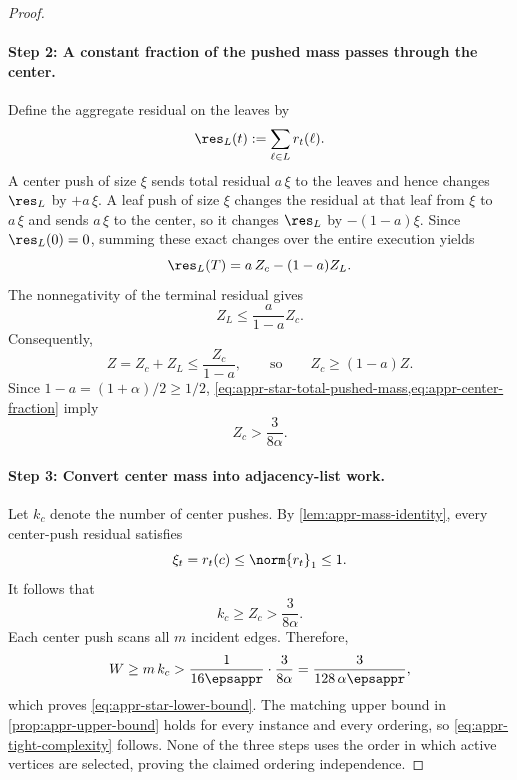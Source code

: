 \begin{proof}
\paragraph{Step 2: A constant fraction of the pushed mass passes through the
center.}
Define the aggregate residual on the leaves by
\begin{equation}
    \res_L(t):=\sum_{\ell\in L}r_t(\ell).
    \label{eq:appr-leaf-residual}
\end{equation}
A center push of size \(\xi\) sends total residual \(a\,\xi\) to the leaves and
hence changes \(\res_L\) by \(+a\,\xi\). A leaf push of size \(\xi\) changes the
residual at that leaf from \(\xi\) to \(a\,\xi\) and sends \(a\,\xi\) to the center,
so it changes \(\res_L\) by \(-(1-a)\xi\). Since \(\res_L(0)=0\), summing these
exact changes over the entire execution yields
\begin{equation}
    \res_L(T)=a\,Z_c-(1-a)Z_L.
    \label{eq:appr-leaf-flow-identity}
\end{equation}
The nonnegativity of the terminal residual gives
\begin{equation}
    Z_L\leq\frac{a}{1-a}Z_c.
    \label{eq:appr-leaf-center-comparison}
\end{equation}
Consequently,
\begin{equation}
    Z=Z_c+Z_L
    \leq\frac{Z_c}{1-a},
    \qquad\text{so}\qquad
    Z_c\geq(1-a)Z.
    \label{eq:appr-center-fraction}
\end{equation}
Since \(1-a=(1+\alpha)/2\geq1/2\),
\cref{eq:appr-star-total-pushed-mass,eq:appr-center-fraction} imply
\begin{equation}
    Z_c>\frac{3}{8\alpha}.
    \label{eq:appr-center-pushed-mass}
\end{equation}

\paragraph{Step 3: Convert center mass into adjacency-list work.}
Let \(k_c\) denote the number of center pushes. By
\cref{lem:appr-mass-identity}, every center-push residual satisfies
\begin{equation}
    \xi_t=r_t(c)\leq\norm{r_t}_1\leq1.
    \label{eq:appr-center-push-at-most-one}
\end{equation}
It follows that
\begin{equation}
    k_c\geq Z_c>\frac{3}{8\alpha}.
    \label{eq:appr-number-center-pushes}
\end{equation}
Each center push scans all \(m\) incident edges. Therefore,
\begin{equation}
    W
    \geq m\,k_c
    >\frac{1}{16\epsappr}\cdot\frac{3}{8\alpha}
    =\frac{3}{128\,\alpha\epsappr},
    \label{eq:appr-final-star-calculation}
\end{equation}
which proves \cref{eq:appr-star-lower-bound}. The matching upper bound in
\cref{prop:appr-upper-bound} holds for every instance and every ordering, so
\cref{eq:appr-tight-complexity} follows. None of the three steps uses the order
in which active vertices are selected, proving the claimed ordering
independence.
\end{proof}


